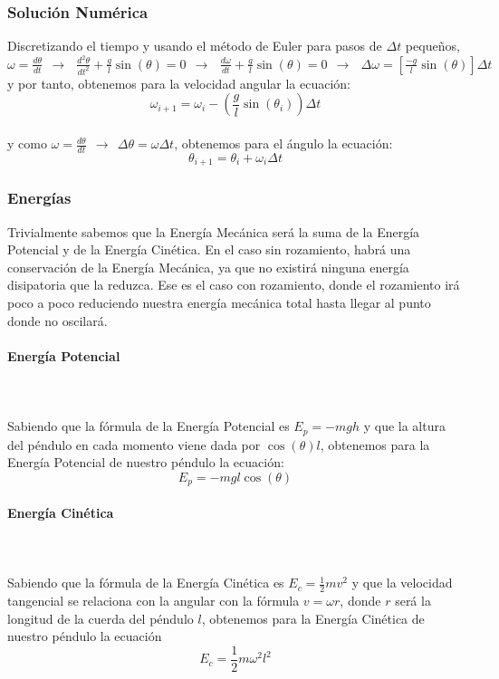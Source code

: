 \documentclass{article}
\begin{document}
\subsubsection{Solución Numérica}
Discretizando el tiempo y usando el método de Euler para pasos de $\Delta t$ pequeños, \\
$\omega = \frac{d\theta}{dt}\ \ \longrightarrow\ \ \ \frac{d^{2}\theta}{dt^{2}} + \frac{g}{l}\sin(\theta) = 0\ \ \longrightarrow\ \ \ \frac{d\omega}{dt} + \frac{g}{l}\sin(\theta) = 0\ \ \longrightarrow\ \ \ \Delta\omega = \left[ \frac{-g}{l}\sin(\theta)\right] \Delta t$ \\
y por tanto, obtenemos para la velocidad angular la ecuación: \[ \boxed{\omega_{i+1} = \omega_{i} - \left(\frac{g}{l}\sin(\theta_{i})\right)\Delta t}\] 
\\ y como $\omega = \frac{d\theta}{dt}\ \ \rightarrow\ \ \Delta \theta = \omega \Delta t$, obtenemos para el ángulo la ecuación: \[ \boxed{\theta_{i+1} = \theta_{i} + \omega_{i} \Delta t}\]

\subsubsection{Energías}
Trivialmente sabemos que la Energía Mecánica será la suma de la Energía Potencial y de la Energía Cinética. En el caso sin rozamiento, habrá una conservación de la Energía Mecánica, ya que no existirá ninguna energía disipatoria que la reduzca. Ese es el caso con rozamiento, donde el rozamiento irá poco a poco reduciendo nuestra energía mecánica total hasta llegar al punto donde no oscilará.
\paragraph{Energía Potencial}\mbox{}\\\\
Sabiendo que la fórmula de la Energía Potencial es $E_{p} = -m g h$ y que la altura del péndulo en cada momento viene dada por $\cos(\theta)l$, obtenemos para la Energía Potencial de nuestro péndulo la ecuación: \\\[ \boxed{E_{p} = -m g l \cos(\theta)}\]
\paragraph{Energía Cinética}\mbox{}\\\\
Sabiendo que la fórmula de la Energía Cinética es $E_{c} = \frac{1}{2} m v^2$ y que la velocidad tangencial se relaciona con la angular con la fórmula $v = \omega r$, donde $r$ será la longitud de la cuerda del péndulo $l$, obtenemos para la Energía Cinética de nuestro péndulo la ecuación \\\[ \boxed{E_{c} = \frac{1}{2} m \omega^{2} l^{2}}\]
\end{document}
